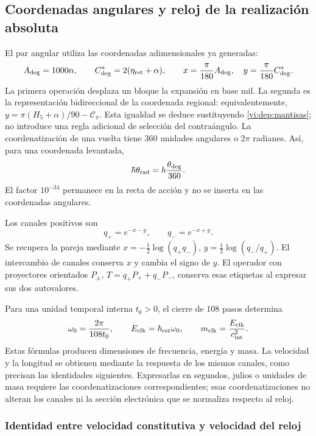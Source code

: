 \subsection{Coordenadas angulares y reloj de la realización absoluta}
\label{vi:dep:reloj}

El par angular utiliza las coordenadas adimensionales ya generadas:
\begin{equation}
 A_{\deg}=1000\alpha,\qquad
 C^*_{\deg}=2(\eta_{\rm ret}+\alpha),\qquad
 x=\frac{\pi}{180}A_{\deg},\quad
 y=\frac{\pi}{180}C^*_{\deg}.
 \label{vi:dep:angulos}
\end{equation}
La primera operación desplaza un bloque la expansión en base mil.
La segunda es la representación bidireccional de la coordenada regional:
equivalentemente,
\(y=\pi(H_5+\alpha)/90-\mathcal C_\pi\).
Esta igualdad se deduce sustituyendo \eqref{vi:dep:mantisas}; no
introduce una regla adicional de selección del contraángulo.
La coordenatización de una vuelta tiene \(360\) unidades angulares o \(2\pi\)
radianes. Así, para una coordenada levantada,
\[
 \hbar\theta_{\rm rad}
 =h\frac{\theta_{\deg}}{360}.
\]
El factor \(10^{-34}\) permanece en la recta de acción y no se
inserta en las coordenadas angulares.

Los canales positivos son
\[
 q_+=e^{-x-y},\qquad q_-=e^{-x+y}.
\]
Se recupera la pareja mediante
\(x=-\tfrac12\log(q_+q_-)\),
\(y=\tfrac12\log(q_-/q_+)\). El intercambio de canales conserva
\(x\) y cambia el signo de \(y\). El operador con proyectores
orientados \(P_\pm\),
\(T=q_+P_++q_-P_-\), conserva esas etiquetas al expresar sus dos
autovalores.

Para una unidad temporal interna \(t_0>0\), el cierre de \(108\)
pasos determina
\begin{equation}
 \omega_0=\frac{2\pi}{108t_0},\qquad
 E_{\rm clk}=\hbar_{\rm ret}\omega_0,
 \qquad m_{\rm clk}=\frac{E_{\rm clk}}{c_{\rm int}^{2}}.
 \label{vi:dep:reloj-absoluto}
\end{equation}
Estas fórmulas producen dimensiones de frecuencia, energía y masa.
La velocidad y la longitud se obtienen mediante la respuesta de los
mismos canales, como precisan las identidades siguientes. Expresarlas
en segundos, julios o unidades de masa requiere las coordenatizaciones
correspondientes; esas coordenatizaciones no alteran los canales ni la sección
electrónica que se normaliza respecto al reloj.

\subsubsection{Identidad entre velocidad constitutiva y velocidad del reloj}

